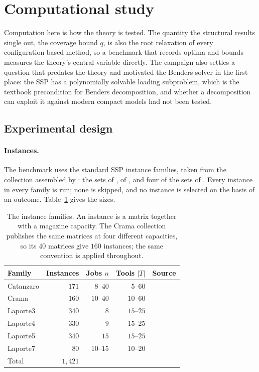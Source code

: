 \section{Computational study}\label{sec:comp}

Computation here is how the theory is tested. The quantity the
structural results single out, the coverage bound $q$, is also the root relaxation of
every configuration-based method, so a benchmark that records optima and bounds
measures the theory's central variable directly. The campaign also settles a question
that predates the theory and motivated the Benders solver in the first place: the SSP
has a polynomially solvable loading subproblem, which is the textbook precondition for
Benders decomposition, and whether a decomposition can exploit it against modern
compact models had not been tested.

\subsection{Experimental design}\label{ssec:bench}

\paragraph{Instances.}
The benchmark uses the standard SSP instance families, taken from the collection
assembled by \citet{Otiai2024}: the sets of \citet{Catanzaro2015}, of
\citet{Crama1994}, and four of the sets of \citet{Laporte2004}. Every instance in
every family is run; none is skipped, and no instance is selected on the basis of an
outcome. Table~\ref{tab:families} gives the sizes.

\begin{table}[h]\centering
\footnotesize
\begin{tabular}{@{}lrrrl@{}}
\toprule
Family & Instances & Jobs $n$ & Tools $\lvert T\rvert$ & Source \\
\midrule
Catanzaro & $171$ & $8$--$40$  & $5$--$60$  & \citet{Catanzaro2015} \\
Crama     & $160$ & $10$--$40$ & $10$--$60$ & \citet{Crama1994} \\
Laporte3  & $340$ & $8$        & $15$--$25$ & \citet{Laporte2004} \\
Laporte4  & $330$ & $9$        & $15$--$25$ & \citet{Laporte2004} \\
Laporte5  & $340$ & $15$       & $15$--$25$ & \citet{Laporte2004} \\
Laporte7  & $80$  & $10$--$15$ & $10$--$20$ & \citet{Laporte2004} \\
\midrule
Total     & $1{,}421$ & & & \\
\bottomrule
\end{tabular}
\caption{The instance families. An instance is a matrix together with a magazine
capacity. The Crama collection publishes the same matrices at four different
capacities, so its $40$ matrices give $160$ instances; the same convention is applied
throughout.}
\label{tab:families}
\end{table}

